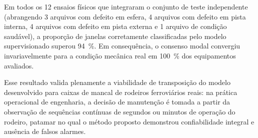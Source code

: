 Em todos os 12 ensaios físicos que integraram o conjunto de teste independente (abrangendo 3 arquivos com defeito em esfera, 4 arquivos com defeito em pista interna, 4 arquivos com defeito em pista externa e 1 arquivo de condição saudável), a proporção de janelas corretamente classificadas pelo modelo supervisionado superou \SI{94}{\percent}. Em consequência, o consenso modal convergiu invariavelmente para a condição mecânica real em \SI{100}{\percent} dos equipamentos avaliados.

Esse resultado valida plenamente a viabilidade de transposição do modelo desenvolvido para caixas de mancal de rodeiros ferroviários reais: na prática operacional de engenharia, a decisão de manutenção é tomada a partir da observação de sequências contínuas de segundos ou minutos de operação do rodeiro, patamar no qual o método proposto demonstrou confiabilidade integral e ausência de falsos alarmes.
